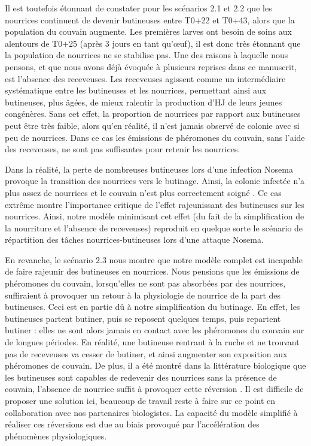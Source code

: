 		Il est toutefois étonnant de constater pour les scénarios 2.1 et 2.2 que les nourrices continuent de devenir butineuses entre T0+22 et T0+43, alors que la population du couvain augmente. Les premières larves ont besoin de soins aux alentours de T0+25 (après 3 jours en tant qu'œuf), il est donc très étonnant que la population de nourrices ne se stabilise pas. Une des raisons à laquelle nous pensons, et que nous avons déjà évoquée à plusieurs reprises dans ce manuscrit, est l'absence des receveuses. Les receveuses agissent comme un intermédiaire systématique entre les butineuses et les nourrices, permettant ainsi aux butineuses, plus âgées, de mieux ralentir la production d'HJ de leurs jeunes congénères. Sans cet effet, la proportion de nourrices par rapport aux butineuses peut être très faible, alors qu'en réalité, il n'est jamais observé de colonie avec si peu de nourrices. Dans ce cas les émissions de phéromones du couvain, sans l'aide des receveuses, ne sont pas suffisantes pour retenir les nourrices.
		
		 Dans la réalité, la perte de nombreuses butineuses lors d'une infection Nosema provoque la transition des nourrices vers le butinage. Ainsi, la colonie infectée n'a plus assez de nourrices et le couvain n'est plus correctement soigné \cite{hassanein_influence_1953, higes_how_2008}. Ce cas extrême montre l'importance critique de l'effet rajeunissant des butineuses sur les nourrices. Ainsi, notre modèle minimisant cet effet (du fait de la simplification de la nourriture et l'absence de receveuses) reproduit en quelque sorte le scénario de répartition des tâches nourrices-butineuses lors d'une attaque Nosema.	
		 
		 En revanche, le scénario 2.3 nous montre que notre modèle complet est incapable de faire rajeunir des butineuses en nourrices. Nous pensions que les émissions de phéromones du couvain, lorsqu'elles ne sont pas absorbées par des nourrices, suffiraient à provoquer un retour à la physiologie de nourrice de la part des butineuses. Ceci est en partie dû à notre simplification du butinage. En effet, les butineuses partent butiner, puis se reposent quelques temps, puis repartent butiner : elles ne sont alors jamais en contact avec les phéromones du couvain sur de longues périodes. En réalité, une butineuse rentrant à la ruche et ne trouvant pas de receveuses va cesser de butiner, et ainsi augmenter son exposition aux phéromones de couvain. De plus, il a été montré dans la littérature biologique que les butineuses sont capables de redevenir des nourrices sans la présence de couvain, l'absence de nourrice suffit à provoquer cette réversion \cite{huang_regulation_1996}. Il est difficile de proposer une solution ici, beaucoup de travail reste à faire sur ce point en collaboration avec nos partenaires biologistes.
		 La capacité du modèle simplifié à réaliser ces réversions est due au biais provoqué par l'accélération des phénomènes physiologiques.
		
